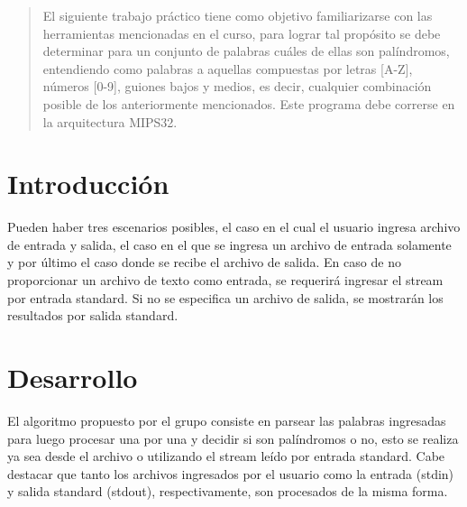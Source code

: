 \documentclass[a4paper]{article}
\begin{document}

\fecha{\today}


\maketitle

\begin{abstract}
El siguiente trabajo práctico tiene como objetivo familiarizarse con las herramientas mencionadas en el curso, para lograr tal propósito se debe determinar para un conjunto de palabras cuáles de ellas son palíndromos, entendiendo como palabras a aquellas compuestas por letras [A-Z], números [0-9], guiones bajos y medios, es decir, cualquier combinación posible de los anteriormente mencionados. Este programa debe correrse en la arquitectura MIPS32.
\end{abstract}


\section{Introducción}
Pueden haber tres escenarios posibles, el caso en el cual el usuario ingresa archivo de entrada y salida, el caso en el que se ingresa un archivo de entrada solamente y por último el caso donde se recibe el archivo de salida. En caso de no proporcionar un archivo de texto como entrada, se requerirá ingresar el stream por entrada standard. Si no se especifica un archivo de salida, se mostrarán los resultados por salida standard. 


\section{Desarrollo}

El algoritmo propuesto por el grupo consiste en parsear las palabras ingresadas para luego procesar una por una y decidir si son palíndromos o no, esto se realiza ya sea desde el archivo o utilizando el stream leído por entrada standard. Cabe destacar que tanto los archivos ingresados por el usuario como la entrada (stdin) y salida standard (stdout), respectivamente, son procesados de la misma forma.
\end{document}

